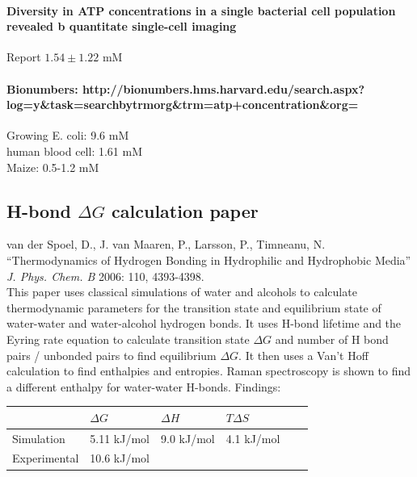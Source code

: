 \documentclass[10pt]{article} %
\begin{document}
\paragraph{Diversity in ATP concentrations in a single bacterial cell population revealed b quantitate single-cell imaging}

Report $1.54\pm1.22$ mM\\

\paragraph{Bionumbers: http://bionumbers.hms.harvard.edu/search.aspx?log=y\&task=searchbytrmorg\&trm=atp+concentration\&org=}

Growing E. coli: 9.6 mM\\
human blood cell: 1.61 mM\\
Maize: 0.5-1.2 mM\\

\subsection{H-bond $\Delta G$ calculation paper}
van der Spoel, D., J. van Maaren, P., Larsson, P., Timneanu, N. ``Thermodynamics of Hydrogen Bonding in Hydrophilic and Hydrophobic Media'' \textit{J. Phys. Chem. B} 2006: 110, 4393-4398.\\

This paper uses classical simulations of water and alcohols to calculate thermodynamic parameters for the transition state and equilibrium state of water-water and water-alcohol
hydrogen bonds. It uses H-bond lifetime and the Eyring rate equation to calculate transition state $\Delta G$ and number of H bond pairs / unbonded pairs to find equilibrium
$\Delta G$. It then uses a Van't Hoff calculation to find enthalpies and entropies. Raman spectroscopy is shown to find a different enthalpy for water-water H-bonds. Findings:

\begin{center}
  \begin{tabular}{| l | l | l | l | l | l |}
    \hline
    & $\Delta G$ & $\Delta H$ & $T\Delta S$ \\\hline
    Simulation & 5.11 kJ/mol & 9.0 kJ/mol & 4.1 kJ/mol\\ \hline
    Experimental & 10.6 kJ/mol & & \\ \hline
  \end{tabular}
\end{center}
\end{document}
